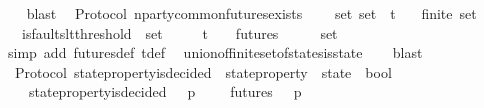 \begin{isabellebody}
\ \ \isamarkupfalse%
\ blast%
\endisatagproof
{\isafoldproof}%
%
\isadelimproof
\isanewline
%
\endisadelimproof
\isanewline
{}\isamarkupfalse%
\ {\isacharparenleft}\ Protocol{\isacharparenright}\ n{\isacharunderscore}party{\isacharunderscore}common{\isacharunderscore}futures{\isacharunderscore}exists\ {\isacharcolon}\isanewline
\ \ {\isachardoublequoteopen}{\isasymforall}\ {\isasymsigma}{\isacharunderscore}set{\isachardot}\ {\isasymsigma}{\isacharunderscore}set\ {\isasymsubseteq}\ {\isasymSigma}t\isanewline
\ \ {\isasymlongrightarrow}\ finite\ {\isasymsigma}{\isacharunderscore}set\isanewline
\ \ {\isasymlongrightarrow}\ is{\isacharunderscore}faults{\isacharunderscore}lt{\isacharunderscore}threshold\ {\isacharparenleft}{\isasymUnion}\ {\isasymsigma}{\isacharunderscore}set{\isacharparenright}\isanewline
\ \ {\isasymlongrightarrow}\ {\isacharparenleft}{\isasymexists}\ {\isasymsigma}\ {\isasymin}{\isasymSigma}t{\isachardot}\ {\isasymsigma}\ {\isasymin}\ {\isasymInter}\ {\isacharbraceleft}futures\ {\isasymsigma}\ {\isacharbar}\ {\isasymsigma}{\isachardot}\ {\isasymsigma}\ {\isasymin}\ {\isasymsigma}{\isacharunderscore}set{\isacharbraceright}{\isacharparenright}{\isachardoublequoteclose}\isanewline
%
\isadelimproof
\ \ %
\endisadelimproof
%
\isatagproof
{}\isamarkupfalse%
\ {\isacharparenleft}simp\ add{\isacharcolon}\ futures{\isacharunderscore}def\ {\isasymSigma}t{\isacharunderscore}def{\isacharparenright}\ \isamarkupfalse%
\ union{\isacharunderscore}of{\isacharunderscore}finite{\isacharunderscore}set{\isacharunderscore}of{\isacharunderscore}states{\isacharunderscore}is{\isacharunderscore}state\isanewline
\ \ \isamarkupfalse%
\ blast%
\endisatagproof
{\isafoldproof}%
%
\isadelimproof
\isanewline
%
\endisadelimproof
\isanewline
\isanewline
\isanewline
\isanewline
\isanewline
{}\isamarkupfalse%
\ {\isacharparenleft}\ Protocol{\isacharparenright}\ state{\isacharunderscore}property{\isacharunderscore}is{\isacharunderscore}decided\ {\isacharcolon}{\isacharcolon}\ {\isachardoublequoteopen}{\isacharparenleft}state{\isacharunderscore}property\ {\isacharasterisk}\ state{\isacharparenright}\ {\isasymRightarrow}\ bool{\isachardoublequoteclose}\isanewline
\ \ \isanewline
\ \ \ \ {\isachardoublequoteopen}state{\isacharunderscore}property{\isacharunderscore}is{\isacharunderscore}decided\ \ {\isacharequal}\ {\isacharparenleft}{\isasymlambda}{\isacharparenleft}p{\isacharcomma}\ {\isasymsigma}{\isacharparenright}{\isachardot}\ {\isacharparenleft}{\isasymforall}\ {\isasymsigma}{\isacharprime}\ {\isasymin}\ futures\ {\isasymsigma}\ {\isachardot}\ p\ {\isasymsigma}{\isacharprime}{\isacharparenright}{\isacharparenright}{\isachardoublequoteclose}\isanewline

\end{isabellebody}
